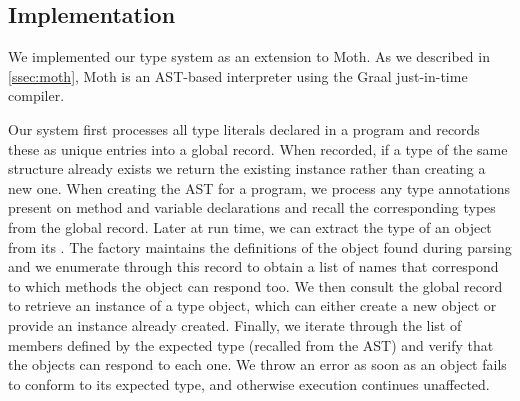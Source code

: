 

\subsection{Implementation}
\label{sec:implementation}

We implemented our type system as an extension to Moth.
As we described in \cref{ssec:moth},
Moth is an AST-based interpreter
using the Graal just-in-time compiler\citep{Wurthinger:2017:PPE}.


Our system first processes all type literals declared in a program and records these as
unique entries into a global record.
When recorded, if a type of the same structure already exists we return the existing instance
rather than creating a new one.
When creating the AST for a program, 
we process any type annotations present on method and variable declarations and
recall the corresponding types from the global record. 
Later at run time, we can extract the type of an object from its .
The factory maintains the definitions of the object found during parsing and
we enumerate through this record to obtain a list of names that correspond
to which methods the object can respond too.
We then consult the global record to retrieve an instance of a type object,
which can either create a new object or provide an instance already created.
Finally, we iterate through the list of members defined by the expected type 
(recalled from the AST) and verify that the objects can respond to each one.
We throw an error as soon as an object fails to conform to its expected type, 
and otherwise execution continues unaffected.

